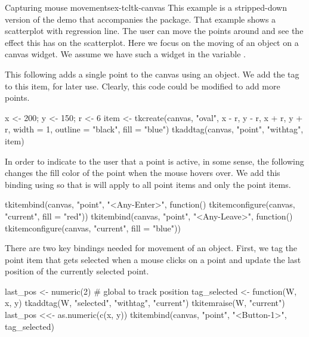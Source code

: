 \begin{example}{Capturing mouse movements}{ex-tcltk-canvas}
This example is a stripped-down version of the  demo
that accompanies the  package. That example shows a
scatterplot with regression line. The user can move the points around
and see the effect this has on the scatterplot. Here we focus on the
moving of an object on a canvas widget. We assume we have such a
widget in the variable .


This following adds a single point to the canvas using an
 object. We add the  tag to this item, for
later use. Clearly, this code could be modified to add more points.
\begin{Schunk}
\begin{Sinput}
 x <- 200; y <- 150; r <- 6
 item <- tkcreate(canvas, "oval", x - r, y - r, x + r, y + r,
                  width = 1, outline = "black",
                  fill = "blue")
 tkaddtag(canvas, "point", "withtag", item)
\end{Sinput}
\end{Schunk}

In order to indicate to the user that a point is active, in some
sense, the following changes the fill color of the point when the
mouse hovers over. We add this binding using 
so that is will apply to all point items and only the point items.
\begin{Schunk}
\begin{Sinput}
 tkitembind(canvas, "point", "<Any-Enter>", function()
            tkitemconfigure(canvas, "current", fill = "red"))
 tkitembind(canvas, "point", "<Any-Leave>", function()
            tkitemconfigure(canvas, "current", fill = "blue"))
\end{Sinput}
\end{Schunk}

There are two key bindings needed for movement of an object. First, we
tag the point item that gets selected when a mouse clicks on a point
and update the last position of the currently selected point.
\begin{Schunk}
\begin{Sinput}
 last_pos <- numeric(2)            # global to track position
 tag_selected <- function(W, x, y) {
   tkaddtag(W,  "selected",  "withtag",  "current")
   tkitemraise(W, "current")
   last_pos <<- as.numeric(c(x, y))
 }
 tkitembind(canvas, "point", "<Button-1>",  tag_selected)
\end{Sinput}
\end{Schunk}


\end{example}

